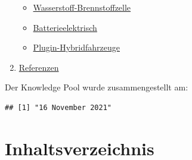 \documentclass[
]{book}
\providecommand{\tightlist}{%
  \setlength{\itemsep}{0pt}\setlength{\parskip}{0pt}}
\begin{document}
\begin{enumerate}
  \begin{itemize}
  \tightlist
  \item
    \protect\hyperlink{FCEV}{Wasserstoff-Brennstoffzelle}\\
  \item
    \protect\hyperlink{bev}{Batterieelektrisch}\\
  \item
    \protect\hyperlink{plugin_hybrid}{Plugin-Hybridfahrzeuge}\\
  \end{itemize}
\item
  \protect\hyperlink{reference}{Referenzen}
\end{enumerate}

Der Knowledge Pool wurde zusammengestellt am:

\begin{verbatim}
## [1] "16 November 2021"
\end{verbatim}

\hypertarget{inhaltsverzeichnis}{%
\chapter*{Inhaltsverzeichnis}\label{inhaltsverzeichnis}}
\end{document}
